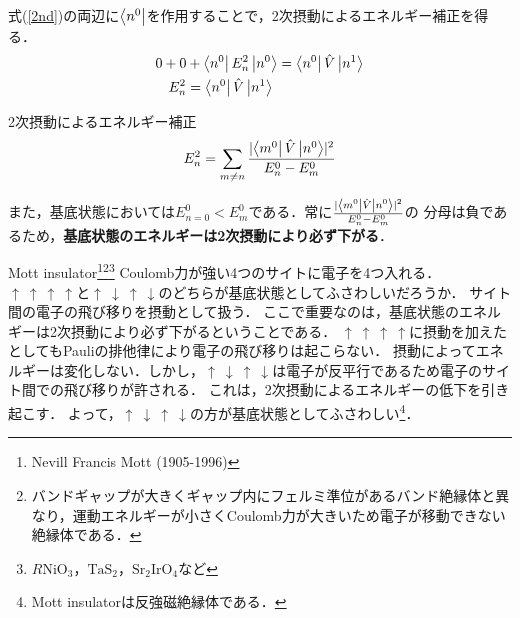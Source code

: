 \documentclass{standalone}
\begin{document}
  式(\ref{2nd})の両辺に$\bra{n^0}$を作用することで，2次摂動によるエネルギー補正を得る．
  \begin{align}
    0+0&+\bra{n^0}E_n^2\ket{n^0}=\bra{n^0}\hat{V}\ket{n^1}\\
    E_n^2&=\bra{n^0}\hat{V}\ket{n^1}
  \end{align}
  \begin{itembox}[l]{2次摂動によるエネルギー補正}
  \begin{equation}
    E_n^2=\sum_{m\ne n}\frac{\lvert \bra{m^0}\hat{V}\ket{n^0}\rvert^2}{E_n^0-E_m^0}
  \end{equation}
  \end{itembox}
  また，基底状態においては$E_{n=0}^0 < E_m^0$である．常に$\frac{\lvert \bra{m^0}\hat{V}\ket{n^0}\rvert^2}{E_n^0-E_m^0}$の
  分母は負であるため，\textbf{基底状態のエネルギーは2次摂動により必ず下がる}．
  \begin{myex}{Mott insulator\footnote{
      Nevill Francis Mott (1905-1996)
    }\footnote{
      バンドギャップが大きくギャップ内にフェルミ準位があるバンド絶縁体と異なり，運動エネルギーが小さくCoulomb力が大きいため電子が移動できない絶縁体である．
    }\footnote{
      $R\mathrm{NiO_3，TaS_2，Sr_2IrO_4}$など
    }}{}
    Coulomb力が強い4つのサイトに電子を4つ入れる．
    $\uparrow \ \uparrow\ \uparrow\ \uparrow$と$\uparrow\ \downarrow\ \uparrow\ \downarrow$のどちらが基底状態としてふさわしいだろうか．
    サイト間の電子の飛び移りを摂動として扱う．
    ここで重要なのは，基底状態のエネルギーは2次摂動により必ず下がるということである．
    $\uparrow \ \uparrow\ \uparrow\ \uparrow$に摂動を加えたとしてもPauliの排他律により電子の飛び移りは起こらない．
    摂動によってエネルギーは変化しない．しかし，$\uparrow\ \downarrow\ \uparrow\ \downarrow$は電子が反平行であるため電子のサイト間での飛び移りが許される．
    これは，2次摂動によるエネルギーの低下を引き起こす．
    よって，$\uparrow\ \downarrow\ \uparrow\ \downarrow$の方が基底状態としてふさわしい\footnote{
      Mott insulatorは反強磁絶縁体である．
    }．
  \end{myex}
\end{document}
